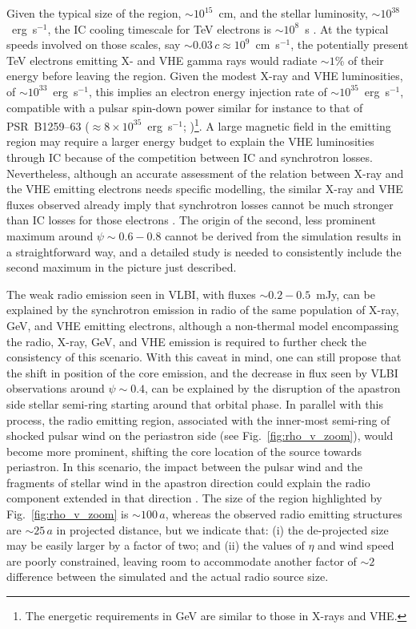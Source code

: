 \documentclass[usenatbib]{mn2e}
\def\psr{{PSR~B1259--63}}
\begin{document}
Given the typical size of the region, $\sim 10^{15}$~cm, and the stellar luminosity, $\sim 10^{38}$~erg~s$^{-1}$, the IC cooling timescale for TeV electrons is $\sim 10^8$~s \citep{kha14}. At the typical speeds involved on those scales, say $\sim 0.03\,c\approx 10^9$~cm~s$^{-1}$, the potentially present TeV electrons emitting X- and VHE gamma rays would radiate $\sim 1$\% of their energy before leaving the region. Given the modest X-ray and VHE luminosities, of $\sim 10^{33}$~erg~s$^{-1}$, this implies an electron energy injection rate of $\sim 10^{35}$~erg~s$^{-1}$, compatible with a pulsar spin-down power similar for instance to that of \psr{} ($\approx 8\times 10^{35}$~erg~s$^{-1}$; \citealt{joh92})\footnote{{The energetic requirements in GeV \citep{li17} are similar to those in X-rays and VHE.}}. A large magnetic field in the emitting region may require a larger energy budget to explain the VHE luminosities through IC because of the competition between IC and synchrotron losses. Nevertheless, although an accurate assessment of the relation between X-ray and the VHE emitting electrons needs specific modelling, the similar X-ray and VHE fluxes observed already imply that synchrotron losses {cannot be much stronger than IC losses for those electrons \citep{ali14}.} The origin of the second, less prominent maximum around $\psi\sim 0.6-0.8$ cannot be derived from the simulation results in a straightforward way, and a detailed study is needed to consistently include the second maximum in the picture just described.

The weak radio emission seen in VLBI, with fluxes $\sim 0.2-0.5$~mJy, can be explained by the synchrotron emission in radio of the same population of X-ray{, GeV,} and VHE emitting electrons, although a non-thermal model encompassing the radio, X-ray{, GeV,} and VHE emission is required to further check the consistency of this scenario. With this caveat in mind, one can still propose that the shift in position of the core emission, and the decrease in flux seen by VLBI observations \citep{mol11b} around $\psi\sim 0.4$, can be explained by the disruption of the apastron side stellar semi-ring starting around that orbital phase. In parallel with this process, the radio emitting region, associated with the inner-most semi-ring of shocked pulsar wind on the periastron side (see Fig.~\ref{fig:rho_v_zoom}), would become more prominent, shifting the core location of the source towards periastron. In this scenario, the impact between the pulsar wind and the fragments of stellar wind in the apastron direction could explain the radio component extended in that direction \citep[see][for a similar explanation regarding the X-ray extended emission in \psr]{bb16}. The size of the region highlighted by Fig.~\ref{fig:rho_v_zoom} is $\sim 100\,a$, whereas the observed radio emitting structures are $\sim 25\,a$ in projected distance, but we indicate that: (i) the de-projected size may be easily larger by a factor of two; and (ii) the values of $\eta$ and wind speed are poorly constrained, leaving room to accommodate another factor of $\sim 2$ difference between the simulated and the actual radio source size.
\end{document}

